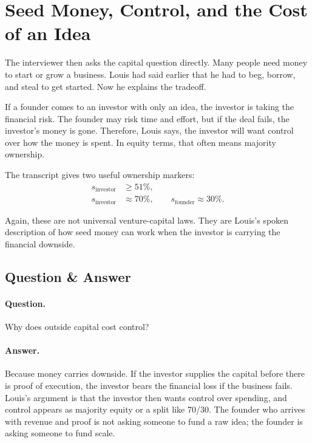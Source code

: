 \section{Seed Money, Control, and the Cost of an Idea}

The interviewer then asks the capital question directly. Many people need money to start or grow a business. Louis had said earlier that he had to beg, borrow, and steal to get started. Now he explains the tradeoff.

If a founder comes to an investor with only an idea, the investor is taking the financial risk. The founder may risk time and effort, but if the deal fails, the investor's money is gone. Therefore, Louis says, the investor will want control over how the money is spent. In equity terms, that often means majority ownership.

The transcript gives two useful ownership markers:
\begin{align}
s_{\mathrm{investor}} &\geq 51\%,\\
s_{\mathrm{investor}} &\approx 70\%, \qquad
s_{\mathrm{founder}} \approx 30\%.
\end{align}

Again, these are not universal venture-capital laws. They are Louis's spoken description of how seed money can work when the investor is carrying the financial downside.

\subsection{Question \& Answer}

\paragraph{Question.} Why does outside capital cost control?

\paragraph{Answer.} Because money carries downside. If the investor supplies the capital before there is proof of execution, the investor bears the financial loss if the business fails. Louis's argument is that the investor then wants control over spending, and control appears as majority equity or a split like 70/30. The founder who arrives with revenue and proof is not asking someone to fund a raw idea; the founder is asking someone to fund scale.

